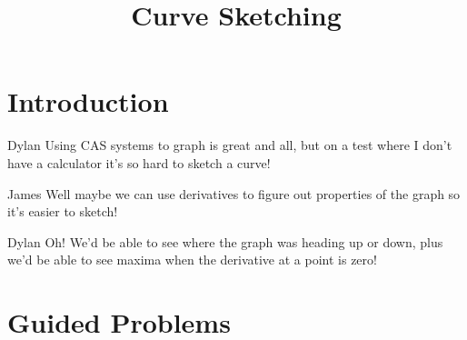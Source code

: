\documentclass{ximera}
\title{Curve Sketching}
\begin{document}
\maketitle
\section{Introduction}
\begin{dialogue}
\item[Dylan] Using CAS systems to graph is great and all, but on a test where I don't have a calculator it's so hard to sketch a curve!
\item[James] Well maybe we can use derivatives to figure out properties of the graph so it's easier to sketch!
\item[Dylan] Oh! We'd be able to see where the graph was heading up or down, plus we'd be able to see maxima when the derivative at a point is zero!
\end{dialogue}

\section{Guided Problems}
\end{document}

